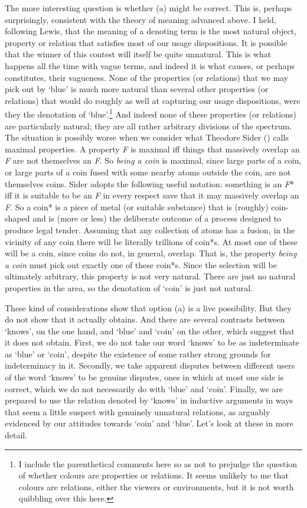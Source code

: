 \documentclass[
  11pt,
  letterpaper,
  DIV=11,
  numbers=noendperiod,
  twoside]{scrartcl}
\begin{document}
The more interesting question is whether (a) might be correct. This is,
perhaps surprisingly, consistent with the theory of meaning advanced
above. I held, following Lewis, that the meaning of a denoting term is
the most natural object, property or relation that satisfies most of our
usage dispositions. It is possible that the winner of this contest will
itself be quite unnatural. This is what happens all the time with vague
terms, and indeed it is what causes, or perhaps constitutes, their
vagueness. None of the properties (or relations) that we may pick out by
`blue' is much more natural than several other properties (or relations)
that would do roughly as well at capturing our usage dispositions, were
they the denotation of `blue'.\footnote{I include the parenthetical
  comments here so as not to prejudge the question of whether colours
  are properties or relations. It seems unlikely to me that colours are
  relations, either the viewers or environments, but it is not worth
  quibbling over this here.} And indeed none of these properties (or
relations) are particularly natural; they are all rather arbitrary
divisions of the spectrum. The situation is possibly worse when we
consider what Theodore Sider ()
calls maximal properties. A property \emph{F} is maximal iff things that
massively overlap an \emph{F} are not themselves an \emph{F}. So
\emph{being a coin} is maximal, since large parts of a coin, or large
parts of a coin fused with some nearby atoms outside the coin, are not
themselves coins. Sider adopts the following useful notation: something
is an \emph{F}* iff it is suitable to be an \emph{F} in every respect
save that it may massively overlap an \emph{F}. So a coin* is a piece of
metal (or suitable substance) that is (roughly) coin-shaped and is (more
or less) the deliberate outcome of a process designed to produce legal
tender. Assuming that any collection of atoms has a fusion, in the
vicinity of any coin there will be literally trillions of coin*s. At
most one of these will be a coin, since coins do not, in general,
overlap. That is, the property \emph{being a coin} must pick out exactly
one of these coin*s. Since the selection will be ultimately arbitrary,
this property is not very natural. There are just no natural properties
in the area, so the denotation of `coin' is just not natural.

These kind of considerations show that option (a) is a live possibility.
But they do not show that it actually obtains. And there are several
contrasts between `knows', on the one hand, and `blue' and `coin' on the
other, which suggest that it does not obtain. First, we do not take our
word `knows' to be as indeterminate as `blue' or `coin', despite the
existence of some rather strong grounds for indeterminacy in it.
Secondly, we take apparent disputes between different users of the word
`knows' to be genuine disputes, ones in which at most one side is
correct, which we do not necessarily do with `blue' and `coin'. Finally,
we are prepared to use the relation denoted by `knows' in inductive
arguments in ways that seem a little suspect with genuinely unnatural
relations, as arguably evidenced by our attitudes towards `coin' and
`blue'. Let's look at these in more detail.
\end{document}
